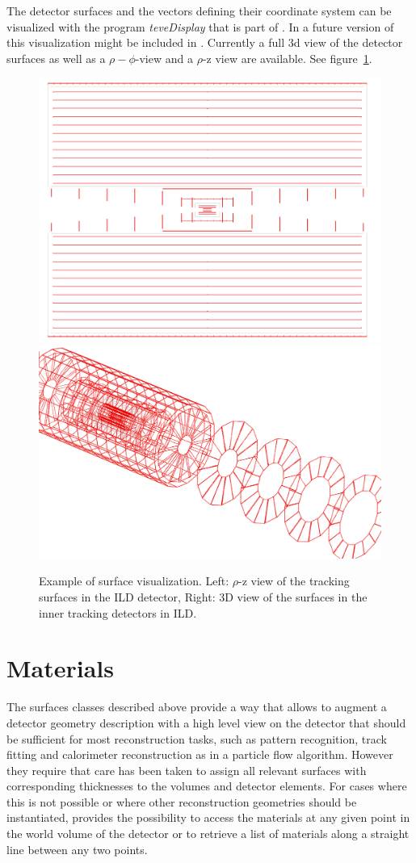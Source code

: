 \documentclass[10pt,a4paper]{article}
\begin{document}
The detector surfaces and the vectors defining their coordinate system can be
visualized with the program {\em teveDisplay} that is part of \DDH. In a future
version of \DDH this visualization might be included in \DDE.
Currently a full 3d view of the detector surfaces as well as a $\rho-\phi$-view
and a $\rho$-z view are available. See figure~\ref{fig:ddrec_surfaces_visualization}.

\begin{figure}[h]
  \begin{center}
    \includegraphics[width=0.48\hsize]{DDRec_rhoz_surfaces.png} \includegraphics[width=0.48\hsize]{DDRec_inner_tracking_surfaces.png}
    \caption{Example of surface visualization. Left: $\rho$-z view of the tracking surfaces in the ILD detector, Right: 3D view of the 
    surfaces in the inner tracking detectors in ILD.}
    \label{fig:ddrec_surfaces_visualization}
  \end{center}
\end{figure}
 


\section{Materials}
\label{sec:ddrec-manual-materials}
The surfaces classes described above provide a way that allows to
augment a detector geometry description with a high level view on the detector
that should be sufficient for most reconstruction tasks, such as pattern
recognition, track fitting and calorimeter reconstruction as in a particle 
flow algorithm. However they require that care has been taken to assign all
relevant surfaces with corresponding thicknesses to the volumes and detector
elements. For cases where this is not possible or where other reconstruction
geometries should be instantiated, \DDR provides the possibility to access
the materials at any given point in the world volume of the detector or 
to retrieve a list of materials along a straight line between any two points.
\end{document}
